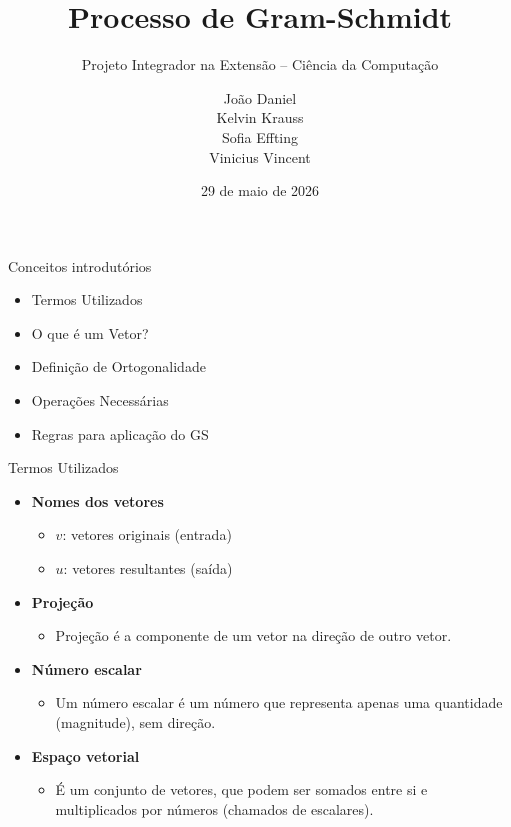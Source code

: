 \documentclass{beamer}
\title{Processo de Gram-Schmidt}
\subtitle{Projeto Integrador na Extensão -- Ciência da Computação}
\author{
João Daniel \\
Kelvin Krauss \\
Sofia Effting \\
Vinicius Vincent \\
}
\institute{Instituto Federal Catarinense - Campus Blumenau}
\date{29 de maio de 2026}
\begin{document}
\begin{frame}
\titlepage
\end{frame}

\begin{frame}{Conceitos introdutórios}



\vspace{0.5cm}

\begin{itemize}
    \item Termos Utilizados
    \item O que é um Vetor?
    \item Definição de Ortogonalidade
    \item Operações Necessárias
    \item Regras para aplicação do GS
\end{itemize}

\end{frame}
\begin{frame}{Termos Utilizados}


\begin{itemize}

    \item \textbf{Nomes dos vetores}
    \begin{itemize}
        \item $v$: vetores originais (entrada)
        \item $u$: vetores resultantes (saída)
    \end{itemize}

    \item \textbf{Projeção}
    \begin{itemize}
        \item Projeção é a componente de um vetor na direção de outro vetor.
    \end{itemize}
    
    \item \textbf{Número escalar}
    \begin{itemize}
        \item Um número escalar é um número que representa apenas uma quantidade (magnitude), sem direção.
    \end{itemize}

    \item \textbf{Espaço vetorial}
    \begin{itemize}
        \item É um conjunto de vetores, que podem ser somados entre si e multiplicados por números (chamados de escalares).
    \end{itemize}

\end{itemize}

\end{frame}
\end{document}
